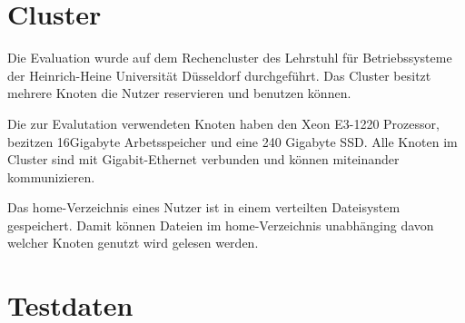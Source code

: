 
\section{Cluster}

Die Evaluation wurde auf dem Rechencluster des Lehrstuhl für Betriebssysteme der Heinrich-Heine Universität Düsseldorf durchgeführt.
Das Cluster besitzt mehrere Knoten die Nutzer reservieren und benutzen können.

Die zur Evalutation verwendeten Knoten haben den Xeon E3-1220 Prozessor, bezitzen 16Gigabyte Arbetsspeicher und eine 240 Gigabyte SSD.
Alle Knoten im Cluster sind mit Gigabit-Ethernet verbunden und können miteinander kommunizieren. 

Das home-Verzeichnis eines Nutzer ist in einem verteilten Dateisystem gespeichert. Damit können Dateien im home-Verzeichnis unabhänging davon welcher Knoten genutzt wird gelesen werden.

\section{Testdaten}

